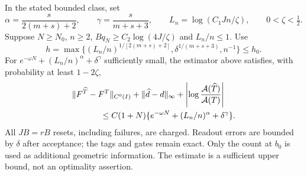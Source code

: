 \begin{theorem}
\label{thm:v73-charged-invariant}
In the stated bounded class, set
\[
 \alpha=\frac{s}{2(m+s)+2},\qquad
 \gamma=\frac{s}{m+s+3},\qquad
 L_n=\log(C_1Jn/\zeta),\qquad 0<\zeta<\tfrac12.
\]
Suppose $N\ge N_0$, $n\ge2$, $Bq_N\ge C_2\log(4J/\zeta)$ and
$L_n/n\le1$.  Use
\[
 h=\max\{(L_n/n)^{1/[2(m+s)+2]},
                    \delta^{1/(m+s+3)},n^{-1}\}\le h_0.
\]
For $e^{-\omega N}+(L_n/n)^\alpha+\delta^\gamma$ sufficiently small,
the estimator above satisfies, with probability at least $1-2\zeta$,
\begin{equation}\label{eq:v73-charged-invariant}
 \begin{split}
  &\|F^{\widehat T}-F^T\|_{C^0(I)}
    +\|\widehat d-d\|_\infty
    +\left|\log\frac{\mathcal A(\widehat T)}{\mathcal A(T)}\right|\\
  &\hspace{12mm}\le C(1+N)
          \{e^{-\omega N}+(L_n/n)^\alpha+\delta^\gamma\}.
 \end{split}
\end{equation}
All $JB=rB$ resets, including failures, are charged.  Readout errors
are bounded by $\delta$ after acceptance; the tags and gates remain exact.
Only the count at $b_0$ is used as additional geometric information.
The estimate is a sufficient upper bound, not an optimality assertion.
\end{theorem}

